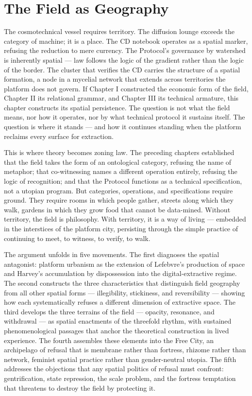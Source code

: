 \chapter{The Field as Geography}
\label{ch:04}

The cosmotechnical vessel requires territory. The diffusion lounge exceeds the category of machine; it is a place. The CD notebook operates as a spatial marker, refusing the reduction to mere currency. The  Protocol's governance by watershed is inherently spatial — law follows the logic of the gradient rather than the logic of the border. The cluster that verifies the CD carries the structure of a spatial formation, a node in a mycelial network that extends across territories the platform does not govern. If Chapter I constructed the economic form of the field, Chapter II its relational grammar, and Chapter III its technical armature, this chapter constructs its spatial persistence. The question is not what the field means, nor how it operates, nor by what technical protocol it sustains itself. The question is where it stands — and how it continues standing when the platform reclaims every surface for extraction.

This is where theory becomes zoning law. The preceding chapters established that the field takes the form of an ontological category, refusing the name of metaphor; that co-witnessing names a different operation entirely, refusing the logic of recognition; and that the   Protocol functions as a technical specification, not a utopian program. But categories, operations, and specifications require ground. They require rooms in which people gather, streets along which they walk, gardens in which they grow food that cannot be data-mined. Without territory, the field is philosophy. With territory, it is a way of living — embedded in the interstices of the platform city, persisting through the simple practice of continuing to meet, to witness, to verify, to walk.

The argument unfolds in five movements. The first diagnoses the spatial antagonist: platform urbanism as the extension of Lefebvre's production of space and Harvey's accumulation by dispossession into the digital-extractive regime. The second constructs the three characteristics that distinguish field geography from all other spatial forms — illegibility, stickiness, and reversibility — showing how each systematically refuses a different dimension of extractive space. The third develops the three terrains of the field — opacity, resonance, and withdrawal — as spatial enactments of the threefold rhythm, with sustained phenomenological passages that anchor the theoretical construction in lived experience. The fourth assembles these elements into the Free City, an archipelago of refusal that is membrane rather than fortress, rhizome rather than network, feminist spatial practice rather than gender-neutral utopia. The fifth addresses the objections that any spatial politics of refusal must confront: gentrification, state repression, the scale problem, and the fortress temptation that threatens to destroy the field by protecting it.

